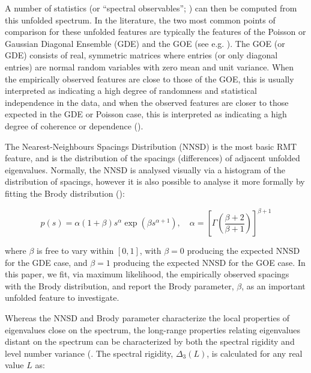 A number of statistics (or ``spectral observables''; \cite{mehtaRandomMatrices2004}) can then be
computed from this unfolded spectrum. In the literature, the two most common points of comparison
for these unfolded features are typically the features of the Poisson or Gaussian Diagonal Ensemble
(GDE) and the GOE (see e.g.
\cite{santhanamStatisticsAtmosphericCorrelations2001,jalanUncoveringRandomnessSuccess2014,bandyopadhyayUniversalityComplexNetworks2007,agrawalQuantifyingRandomnessProtein2014,raiRandomnessPreservedPatterns2015,
sebaRandomMatrixAnalysis2003,wangSpectralPropertiesTemporal2015,wangRandomMatrixTheory2016}). The
GOE (or GDE) consists of real, symmetric matrices where entries (or only diagonal entries) are
normal random variables with zero mean and unit variance. When the empirically observed features are
close to those of the GOE, this is usually interpreted as indicating a high degree of randomness and
statistical independence in the data, and when the observed features are closer to those expected in
the GDE or Poisson case, this is interpreted as indicating a high degree of coherence or dependence
(\cite{santhanamStatisticsAtmosphericCorrelations2001,jalanUncoveringRandomnessSuccess2014,bandyopadhyayUniversalityComplexNetworks2007,agrawalQuantifyingRandomnessProtein2014,raiRandomnessPreservedPatterns2015,
sebaRandomMatrixAnalysis2003,wangSpectralPropertiesTemporal2015,wangRandomMatrixTheory2016,matharooSpontaneousBackpainAlters2020}).

The Nearest-Neighbours Spacings Distribution (NNSD) is the most basic RMT feature, and is the
distribution of the spacings (differences) of adjacent unfolded eigenvalues. Normally, the NNSD is
analysed visually via a histogram of the distribution of spacings, however it is also possible to
analyse it more formally by fitting the Brody distribution (\cite{brodyStatisticalMeasureRepulsion1973}):

\[
p(s) = \alpha (1 + \beta) s^\alpha \exp({\beta s^{\alpha+1}}),
\quad \alpha = \left[ \Gamma \left( \frac{\beta+2}{\beta+1} \right) \right]^{\beta+1}
\]

where \(\beta\) is free to vary within \([0, 1]\), with \(\beta = 0\)  producing the expected NNSD
for the GDE case, and \(\beta = 1\) producing the expected NNSD for the GOE case. In this paper, we
fit, via maximum likelihood, the empirically observed spacings with the Brody distribution, and
report the Brody parameter, \(\beta\), as an important unfolded feature to investigate.

Whereas the NNSD and Brody parameter characterize the local properties of eigenvalues close on the
spectrum, the long-range properties relating eigenvalues distant on the spectrum can be
characterized by both the spectral rigidity and level number variance
(\cite{guhrRandommatrixTheoriesQuantum1998a,mehtaRandomMatrices2004}. The spectral rigidity,
\(\Delta_3(L)\), is calculated for any real value \(L\) as:

